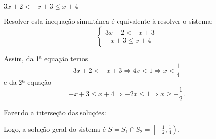 \begin{exem}
    $3x+2<-x+3\leq x+4$

    Resolver esta inequação simultânea é equivalente à resolver o sistema:
    \begin{equation*}
    \left\{
        \begin{matrix}
            3x+2<-x+3\\
            -x+3\leq x+4
        \end{matrix}
    \right.
    \end{equation*}

    Assim, da 1ª equação temos
    \begin{equation*}
        3x+2<-x+3 \Rightarrow 4x<1 \Rightarrow x<\frac{1}{4}
    \end{equation*}
    e da 2ª equação
    \begin{equation*}
        -x+3\leq x+4 \Rightarrow -2x\leq 1 \Rightarrow x\geq -\frac{1}{2}.
    \end{equation*}

    Fazendo a interseção das soluções:
    \begin{intervaloper}[3]{-1}{1}
    \end{intervaloper}
    
    Logo, a solução geral do sistema é $S=S_1\cap S_2 = \left[-\frac{1}{2}, \frac{1}{4} \right)$.
\end{exem}





 
 
  
